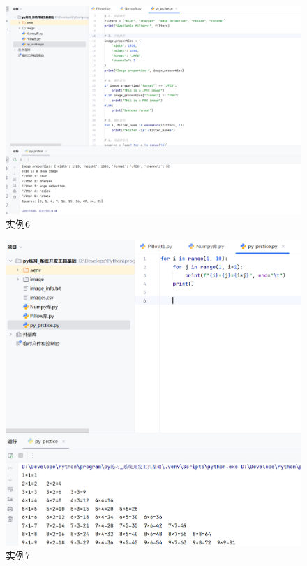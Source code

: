 \documentclass[cn,12pt]{report}
\begin{document}
{    \begin{figure}[htbp]
    \centering
    \includegraphics[width=1\textwidth]{image/6.png}
    \caption{实例6}
  \end{figure}
\FloatBarrier
   
    \begin{figure}[htbp]
    \centering
    \includegraphics[width=1\textwidth]{image/13.png}
    \caption{实例7}
  \end{figure}
\FloatBarrier
   
}
\end{document}
